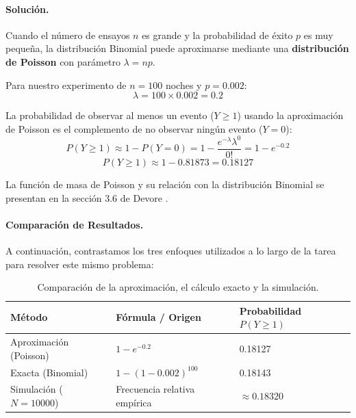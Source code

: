\documentclass[11pt,a4paper]{article}
\begin{document}
\paragraph{Solución.}
Cuando el número de ensayos $n$ es grande y la probabilidad de éxito $p$ es muy pequeña, la distribución Binomial puede aproximarse mediante una \textbf{distribución de Poisson} con parámetro $\lambda = np$.

Para nuestro experimento de $n = 100$ noches y $p = 0.002$:
\[
\lambda = 100 \times 0.002 = 0.2
\]

La probabilidad de observar al menos un evento ($Y \geq 1$) usando la aproximación de Poisson es el complemento de no observar ningún evento ($Y = 0$):
\[
P(Y \geq 1) \approx 1 - P(Y = 0) = 1 - \frac{e^{-\lambda} \lambda^0}{0!} = 1 - e^{-0.2}
\]
\[
P(Y \geq 1) \approx 1 - 0.81873 = \mathbf{0.18127}
\]

La función de masa de Poisson y su relación con la distribución Binomial se presentan en la sección 3.6 de Devore \citep[pp.~121--122]{devore2008}.

\paragraph{Comparación de Resultados.}
A continuación, contrastamos los tres enfoques utilizados a lo largo de la tarea para resolver este mismo problema:

\begin{table}[H]
    \centering
    \caption{Comparación de la aproximación, el cálculo exacto y la simulación.}
    \begin{tabular}{lll}
        \toprule
        Método & Fórmula / Origen & Probabilidad $P(Y\geq1)$\\
        \midrule
        Aproximación (Poisson) & $1-e^{-0.2}$ & 0.18127\\
        Exacta (Binomial) & $1-(1-0.002)^{100}$ & 0.18143\\
        Simulación ($N=10000$) & Frecuencia relativa empírica & $\approx0.18320$\\
        \bottomrule
    \end{tabular}
\end{table}
\end{document}
